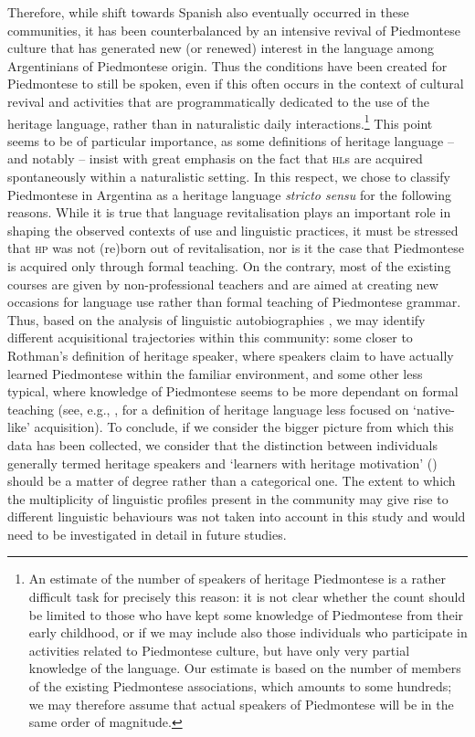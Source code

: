 \documentclass[output=paper]{langscibook}
\begin{document}
Therefore, while shift towards Spanish also eventually occurred in these communities, it has been counterbalanced by an intensive revival of Piedmontese culture that has generated new (or renewed) interest in the language among Argentinians of Piedmontese origin. Thus the conditions have been created for Piedmontese to still be spoken, even if this often occurs in the context of cultural revival and activities that are programmatically dedicated to the use of the heritage language, rather than in naturalistic daily interactions.\footnote{An estimate of the number of speakers of heritage Piedmontese is a rather difficult task for precisely this reason: it is not clear whether the count should be limited to those who have kept some knowledge of Piedmontese from their early childhood, or if we may include also those individuals who participate in activities related to Piedmontese culture, but have only very partial knowledge of the language. Our estimate is based on the number of members of the existing Piedmontese associations, which amounts to some hundreds; we may therefore assume that actual speakers of Piedmontese will be in the same order of magnitude.} This point seems to be of particular importance, as some definitions of heritage language – and notably \citet{Rothman2009} – insist with great emphasis on the fact that \textsc{hl}s are acquired spontaneously within a naturalistic setting. In this respect, we chose to classify Piedmontese in Argentina as a heritage language \textit{stricto sensu} for the following reasons. While it is true that language revitalisation plays an important role in shaping the observed contexts of use and linguistic practices, it must be stressed that \textsc{hp} was not (re)born out of revitalisation, nor is it the case that Piedmontese is acquired only through formal teaching. On the contrary, most of the existing courses are given by non-professional teachers and are aimed at creating new occasions for language use rather than formal teaching of Piedmontese grammar. Thus, based on the analysis of linguistic autobiographies \citep{Goria2023}, we may identify different acquisitional trajectories within this community: some closer to Rothman’s definition of heritage speaker, where speakers claim to have actually learned Piedmontese within the familiar environment, and some other less typical, where knowledge of Piedmontese seems to be more dependant on formal teaching (see, e.g., \citealt{Kondo-Brown2003}, for a definition of heritage language less focused on ‘native-like’ acquisition). To conclude, if we consider the bigger picture from which this data has been collected, we consider that the distinction between individuals generally termed heritage speakers and ‘learners with heritage motivation’ (\citealt{CarreiraKagan2011}) should be a matter of degree rather than a categorical one. The extent to which the multiplicity of linguistic profiles present in the community may give rise to different linguistic behaviours was not taken into account in this study and would need to be investigated in detail in future studies.
\end{document}
